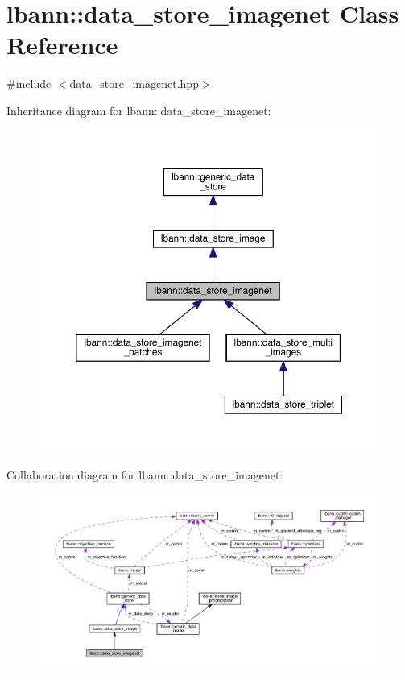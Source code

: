 \hypertarget{classlbann_1_1data__store__imagenet}{}\section{lbann\+:\+:data\+\_\+store\+\_\+imagenet Class Reference}
\label{classlbann_1_1data__store__imagenet}


{\ttfamily \#include $<$data\+\_\+store\+\_\+imagenet.\+hpp$>$}



Inheritance diagram for lbann\+:\+:data\+\_\+store\+\_\+imagenet\+:\nopagebreak
\begin{figure}[H]
\begin{center}
\leavevmode
\includegraphics[width=350pt]{classlbann_1_1data__store__imagenet__inherit__graph}
\end{center}
\end{figure}


Collaboration diagram for lbann\+:\+:data\+\_\+store\+\_\+imagenet\+:\nopagebreak
\begin{figure}[H]
\begin{center}
\leavevmode
\includegraphics[width=350pt]{classlbann_1_1data__store__imagenet__coll__graph}
\end{center}
\end{figure}
